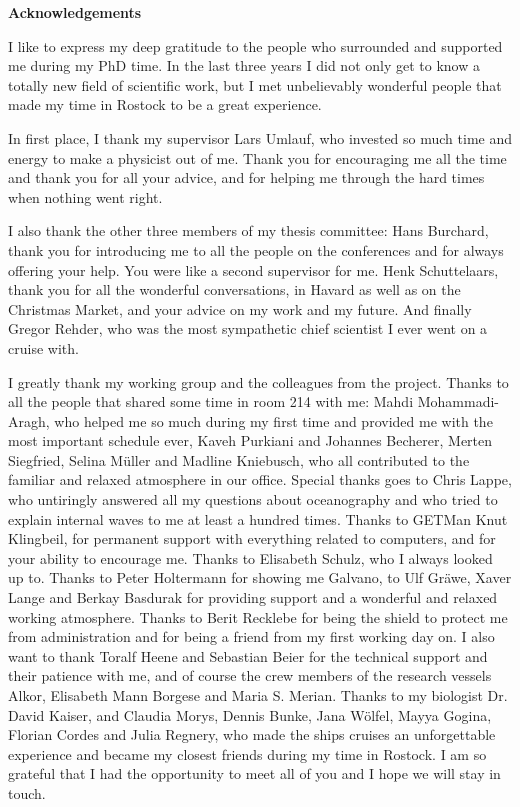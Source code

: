 \cleardoublepage

\thispagestyle{plain}

\begin{center}
 \textbf{Acknowledgements}
\end{center}

I like to express my deep gratitude to the people who surrounded and supported 
me during my PhD time. In the last three years I did not only get to know a 
totally new field of scientific work, but I met unbelievably wonderful 
people that made my time in Rostock to be a great experience. 

In first place, I thank my supervisor Lars Umlauf, who invested so much time 
and energy to make a physicist out of me. Thank you for encouraging me all the 
time and thank you for all your advice, and for helping me through the hard 
times when nothing went right.

I also thank the other three members of my thesis committee: Hans Burchard, 
thank you for introducing me to all the people on the conferences and for 
always offering your help. You were like a second supervisor for me. Henk 
Schuttelaars, thank you for all the wonderful conversations, in Havard as well 
as on the Christmas Market, and your advice on my work and my future. And 
finally Gregor Rehder, who was the most sympathetic chief scientist I ever went 
on a cruise with. 

I greatly thank my working group and the colleagues from the project. Thanks 
to all the people that shared some time in room 214 with me: Mahdi 
Mohammadi-Aragh, who helped me so much during my first time and provided me with 
the most important schedule ever, Kaveh Purkiani and Johannes Becherer, Merten 
Siegfried, Selina Müller and Madline Kniebusch, who all contributed to the 
familiar and relaxed atmosphere in our office. Special thanks goes to Chris 
Lappe, who untiringly answered all my questions about oceanography and who tried 
to explain internal waves to me at least a hundred times. Thanks to GETMan Knut 
Klingbeil, for permanent support with everything related to computers, and for 
your ability to encourage me. Thanks to Elisabeth Schulz, who I always looked up 
to. Thanks to Peter Holtermann for showing me Galvano, to Ulf Gräwe, 
Xaver Lange and Berkay Basdurak for providing support and a wonderful and 
relaxed working atmosphere. Thanks to Berit Recklebe for being the shield to 
protect me from administration and for being a friend from my first working day 
on. I also want to thank Toralf Heene and Sebastian Beier for the technical 
support and their patience with me, and of course the crew members of the 
research vessels Alkor, Elisabeth Mann Borgese and Maria S. Merian. Thanks to 
my biologist Dr. David Kaiser, and Claudia Morys, Dennis Bunke, Jana Wölfel, 
Mayya Gogina, Florian Cordes and Julia Regnery, who made the ships cruises an 
unforgettable experience and became my closest friends during my time in 
Rostock.\newpage
\thispagestyle{plain} I am so grateful that I had the opportunity to meet all of 
you and I hope we will stay in touch.

